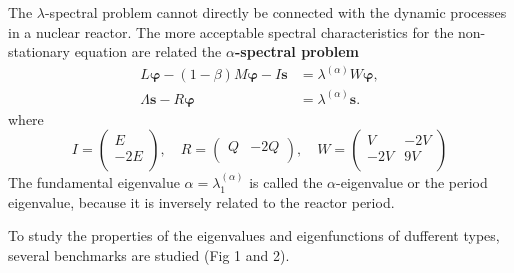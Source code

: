 \documentclass[a1paper,fontscale=0.6]{poster}
\begin{document}
\begin{poster}
{\vspace{0.5em}
The $\lambda$-spectral problem cannot directly be connected with the
dynamic processes in a nuclear reactor. The more acceptable spectral characteristics for the non-stationary equation are related the \textbf{$\alpha$-spectral problem}
\[
\begin{split}
L \bm \varphi - (1 - \beta) M \bm \varphi - I \bm s &= \lambda^{(\alpha)} W \bm \varphi, \\
\Lambda \bm s - R \bm \varphi  &= \lambda^{(\alpha)} \bm s.
\end{split}
\]
where
\[
I = \begin{pmatrix}
E \\
-2E \\
\end{pmatrix},
\quad
R = \begin{pmatrix}
Q & -2Q \\
\end{pmatrix},
\quad
W = \begin{pmatrix}
V & -2V \\
-2V & 9V \\
\end{pmatrix}
\]
The fundamental eigenvalue
$
 \alpha = \lambda^{(\alpha)}_1
$
is called the $\alpha$-eigenvalue or the period eigenvalue, because it is inversely related to the reactor period.

To study the properties of the eigenvalues and eigenfunctions of dufferent types, several benchmarks are studied (Fig 1 and 2).
}


\end{poster}
\end{document}
